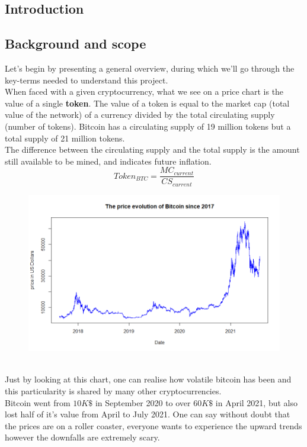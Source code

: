 \documentclass[twoside]{report}
\date{June 2021}
\begin{document}
\begin{spacing}{1}

\selectfont
\tableofcontents




\chapter{Introduction}

\section{Background and scope}
Let's begin by presenting a general overview, during which we'll go through the key-terms needed to understand this project.\\
When faced with a given cryptocurrency, what we see on a price chart is the value of a single \textbf{token}.
The value of a token is equal to the market cap (total value of the network) of a currency divided by the total circulating supply (number of tokens).
Bitcoin has a circulating supply of 19 million tokens but a total supply of 21 million tokens.\\ The difference between the circulating supply and the total supply is the amount still available to be mined, and indicates future inflation. 
$$Token_{BTC}=\frac{MC_{current}}{CS_{current}}$$
\begin{figure}[!htbp]
    \centering
    \includegraphics[scale = 0.7]{TestPlots/BTC_overview.png}
    \caption{}
    \label{}
\end{figure}
\\
Just by looking at this chart, one can realise how volatile bitcoin has been and this particularity is shared by many other cryptocurrencies.\\
Bitcoin went from $10K\$$ in September 2020 to over $60K\$$ in April 2021, but also lost half of it's value from April to July 2021.
One can say without doubt that the prices are on a roller coaster, everyone wants to experience the upward trends however the downfalls are extremely scary.\\


\end{spacing}
\end{document}
